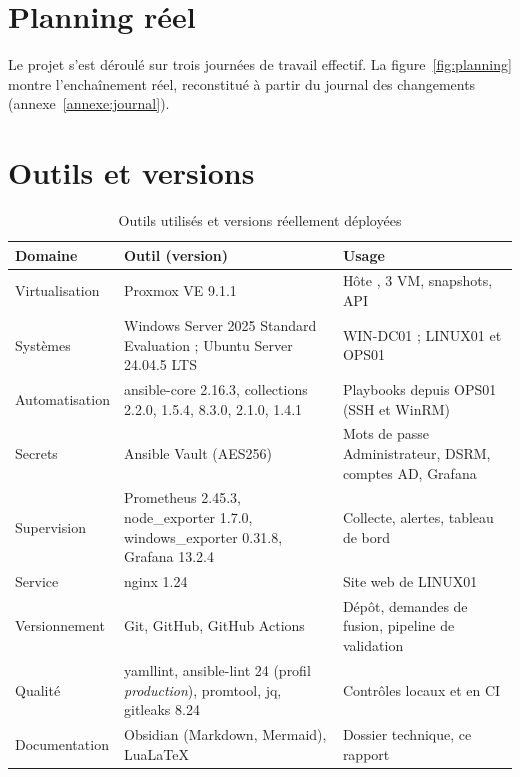 
\section{Planning réel}

Le projet s'est déroulé sur trois journées de travail effectif. La figure~\ref{fig:planning}
montre l'enchaînement réel, reconstitué à partir du journal des changements (annexe~\ref{annexe:journal}).


\section{Outils et versions}

\begin{table}[H]
\centering
\caption{Outils utilisés et versions réellement déployées}\label{tab:outils}
\begin{tabularx}{\linewidth}{@{}P{3.4cm}P{4.4cm}L@{}}
\toprule
\textbf{Domaine} & \textbf{Outil (version)} & \textbf{Usage} \\
\midrule
Virtualisation & Proxmox VE 9.1.1 & Hôte , 3 VM, snapshots, API \\
Systèmes & Windows Server 2025 Standard Evaluation ; Ubuntu Server 24.04.5 LTS & WIN-DC01 ; LINUX01 et OPS01 \\
Automatisation & ansible-core 2.16.3, collections  2.2.0,  1.5.4,  8.3.0,  2.1.0,  1.4.1 & Playbooks depuis OPS01 (SSH et WinRM) \\
Secrets & Ansible Vault (AES256) & Mots de passe Administrateur, DSRM, comptes AD, Grafana \\
Supervision & Prometheus 2.45.3, node\_exporter 1.7.0, windows\_exporter 0.31.8, Grafana 13.2.4 & Collecte, alertes, tableau de bord \\
Service & nginx 1.24 & Site web de LINUX01 \\
Versionnement & Git, GitHub, GitHub Actions & Dépôt, demandes de fusion, pipeline de validation \\
Qualité & yamllint, ansible-lint 24 (profil \emph{production}), promtool, jq, gitleaks 8.24 & Contrôles locaux et en CI \\
Documentation & Obsidian (Markdown, Mermaid), LuaLaTeX & Dossier technique, ce rapport \\
\bottomrule
\end{tabularx}
\end{table}

